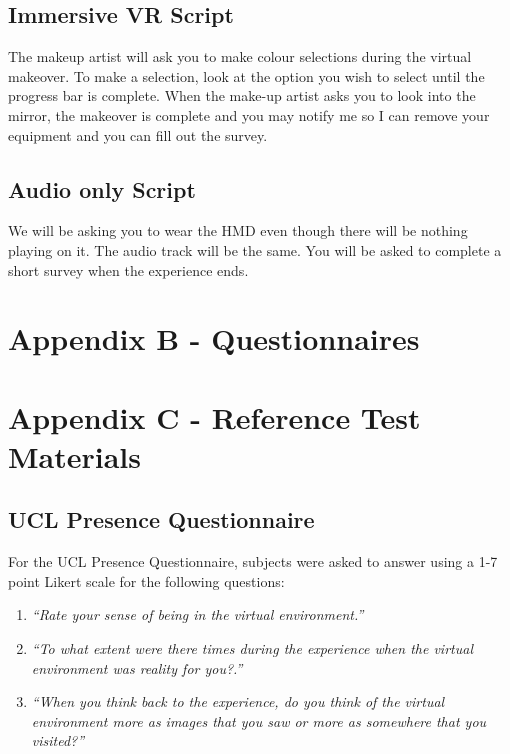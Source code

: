 \documentclass{sigchi}
\newcommand{\inlinequote}[1]{\textit{``#1''}}
\begin{document}
\subsection{Immersive VR Script}
The makeup artist will ask you to make colour selections during the virtual makeover. To make a selection, look at the option you wish to select until the progress bar is complete. When the make-up artist asks you to look into the mirror, the makeover is complete and you may notify me so I can remove your equipment and you can fill out the survey.

\subsection{Audio only Script}
We will be asking you to wear the HMD even though there will be nothing playing on it. The audio track will be the same. You will be asked to complete a short survey when the experience ends.



\section{Appendix B - Questionnaires}
\label{appendix:questionnaire}






\section{Appendix C - Reference Test Materials}
\label{appendix:test_materials}
\subsection{UCL Presence Questionnaire}
For the UCL Presence Questionnaire, subjects were asked to answer using a 1-7 point Likert scale for the following questions:
\begin{enumerate}
	\item{\inlinequote{Rate your sense of being in the virtual environment.}}
	\item{\inlinequote{To what extent were there times during the experience when the virtual environment was reality for you?.}}
	\item{\inlinequote{When you think back to the experience, do you think of the virtual environment more as images that you saw or more	as somewhere that you visited?}}
	\end{enumerate}
\end{document}
